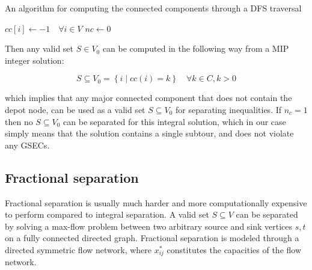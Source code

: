 \begin{algorithm}
	\caption{An algorithm for computing the connected components through a DFS traversal}
	\label{algo:cc-dfs}
	$cc[i] \gets -1 \quad \forall i \in V$\;
	$nc \gets 0$\;

	\;
	\;
	\;
	\;
\end{algorithm}
Then any valid set $S \in V_0$ can be computed in the following way from a MIP integer solution:

\begin{equation}
	S \subseteq V_0 = \left\{ i \mid cc(i) = k  \right\}   \quad \forall k \in C, k > 0
\end{equation}

which implies that any major connected component that does not contain the depot node, can be used as a valid set $S \subseteq V_0$ for separating inequalities.
If $n_c = 1$ then no $S \subseteq V_0$ can be separated for this integral solution, which in our case simply means that the solution contains a single subtour, and does not violate any GSECs.


\subsection{Fractional separation}\label{sec:fractional-separation}
Fractional separation is usually much harder and more computationally expensive to perform compared to integral separation.
A valid set $S \subseteq V$ can be separated by solving a max-flow problem between two arbitrary source and sink vertices $s, t$ on a fully connected directed graph.
Fractional separation is modeled through a directed symmetric flow network, where $x^*_{ij}$ constitutes the capacities of the flow network.

